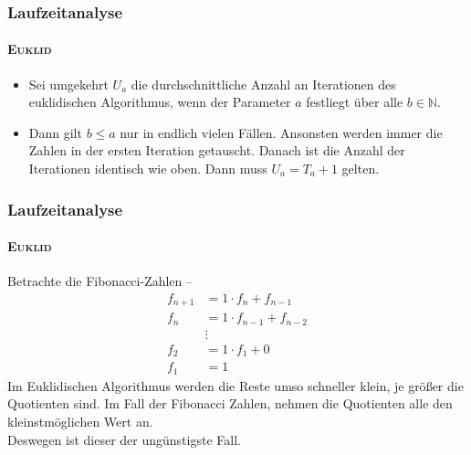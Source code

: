 \documentclass[•]{beamer}
\begin{document}
	\begin{frame}
	\frametitle{Laufzeitanalyse}
	\framesubtitle{\textsc{Euklid}}
	\begin{itemize}
	\item Sei umgekehrt $U_{a}$ die durchschnittliche Anzahl an Iterationen des euklidischen Algorithmus, wenn der Parameter $a$ festliegt \"uber alle $b \in \mathbb{N}$.
	\item Dann gilt $b \leq a$ nur in endlich vielen F\"allen. Ansonsten werden immer die Zahlen in der ersten Iteration getauscht. Danach ist die Anzahl der Iterationen identisch wie oben. Dann muss $U_a = T_a + 1$ gelten.
	\end{itemize}
	\end{frame}
	
	\begin{frame}
	\frametitle{Laufzeitanalyse}
	\framesubtitle{\textsc{Euklid}}

	Betrachte die Fibonacci-Zahlen --
	\begin{align*}
 f_{n+1} &= 1 \cdot f_{n} + f_{n-1} \\
 f_{n} &= 1 \cdot f_{n-1} + f_{n-2} \\
 &\vdots \\
 f_{2} &= 1 \cdot f_{1} + 0 \\
 f_{1} &= 1
\end{align*}
Im Euklidischen Algorithmus werden die Reste umso schneller klein, je gr\"o{\ss}er die Quotienten sind. Im Fall der Fibonacci Zahlen, nehmen die Quotienten alle den kleinstm\"oglichen Wert an. \\Deswegen ist dieser der ung\"unstigste Fall.
\end{frame}	
\end{document}
